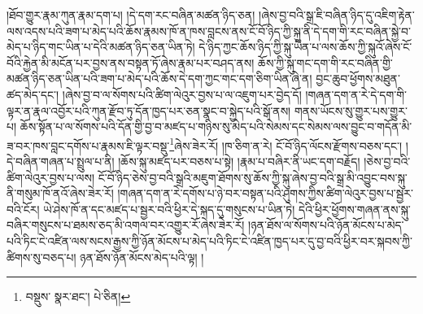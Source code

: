 །ཐོབ་གྱུར་རྣམ་ཀུན་རྣམ་དག་པ། །དེ་དག་རང་བཞིན་མཚན་ཉིད་ཅན། །ཞེས་བྱ་བའི་སྒྲ་ཇི་བཞིན་ཉིད་དུ་འཇིག་རྟེན་ལས་འདས་པའི་ཟག་པ་མེད་པའི་ཆོས་རྣམས་ཁོ་ན་ཁས་བླངས་ནས་ངོ་བོ་ཉིད་ཀྱི་སྐུ་ནི་དེ་དག་གི་རང་བཞིན་སྐྱེ་བ་མེད་པ་ཉིད་གང་ཡིན་པ་དེའི་མཚན་ཉིད་ཅན་ཡིན་ཏེ། དེ་ཉིད་ཀྱང་ཆོས་ཉིད་ཀྱི་སྐུ་ཡིན་པ་ལས་ཆོས་ཀྱི་སྐུའོ་ཞེས་ངོ་བོའི་རྐྱེན་མི་མངོན་པར་བྱས་ནས་བསྟན་ཏོ་ཞེས་རྣམ་པར་བཤད་ནས། ཆོས་ཀྱི་སྐུ་གང་དག་གི་རང་བཞིན་གྱི་མཚན་ཉིད་ཅན་ཡིན་པའི་ཟག་པ་མེད་པའི་ཆོས་དེ་དག་ཀྱང་གང་དག་ཅིག་ཡིན་ཞེ་ན། བྱང་ཆུབ་ཕྱོགས་མཐུན་ཚད་མེད་དང་། །ཞེས་བྱ་བ་ལ་སོགས་པའི་ཚིག་ལེའུར་བྱས་པ་ལ་འཇུག་པར་བྱེད་དོ། །གཞན་དག་ན་རེ་དེ་དག་གི་ལྟར་ན་རྣལ་འབྱོར་པའི་ཀུན་རྫོབ་ཏུ་དོན་ཁྱད་པར་ཅན་སྣང་བ་སྐྱེད་པའི་སྒོ་ནས། གནས་ཡོངས་སུ་གྱུར་པས་གྱུར་པ། ཆོས་སྟོན་པ་ལ་སོགས་པའི་དོན་གྱི་བྱ་བ་མཛད་པ་གཉིས་སུ་མེད་པའི་སེམས་དང་སེམས་ལས་བྱུང་བ་གདོན་མི་ཟ་བར་ཁས་བླང་དགོས་པ་རྣམས་ཇི་ལྟར་བསྡུ་\footnote{བསྡུས་  སྣར་ཐང་།  པེ་ཅིན། }ཞེས་ཟེར་རོ། །ཁ་ཅིག་ན་རེ། ངོ་བོ་ཉིད་ལོངས་རྫོགས་བཅས་དང་། །དེ་བཞིན་གཞན་པ་སྤྲུལ་པ་ནི། །ཆོས་སྐུ་མཛད་པར་བཅས་པ་སྟེ། །རྣམ་པ་བཞིར་ནི་ཡང་དག་བརྗོད། །ཅེས་བྱ་བའི་ཚིག་ལེའུར་བྱས་པ་ལས། ངོ་བོ་ཉིད་ཅེས་བྱ་བའི་སྒྲའི་མཇུག་ཐོགས་སུ་ཆོས་ཀྱི་སྐུ་ཞེས་བྱ་བའི་སྒྲ་མི་འབྱུང་བས་སྐུ་ནི་གསུམ་ཁོ་ནའོ་ཞེས་ཟེར་རོ། །གཞན་དག་ན་རེ་དགོས་པ་ཉེ་བར་བསྟན་པའི་ཤུགས་ཀྱིས་ཚིག་ལེའུར་བྱས་པ་སྦྱར་བའི་ངོར། ཡེ་ཤེས་ཁོ་ན་དང་མཛད་པ་སྦྱར་བའི་ཕྱིར་དེ་སྐད་དུ་གསུངས་པ་ཡིན་ཏེ། དེའི་ཕྱིར་ཕྱོགས་གཞན་ནས་སྐུ་བཞིར་གསུངས་པ་ཐམས་ཅད་མི་འགལ་བར་འགྱུར་རོ་ཞེས་ཟེར་རོ། །ཉན་ཐོས་ལ་སོགས་པའི་ཉོན་མོངས་པ་མེད་པའི་ཏིང་ངེ་འཛིན་ལས་སངས་རྒྱས་ཀྱི་ཉོན་མོངས་པ་མེད་པའི་ཏིང་ངེ་འཛིན་ཁྱད་པར་དུ་བྱ་བའི་ཕྱིར་བར་སྐབས་ཀྱི་ཚིགས་སུ་བཅད་པ། ཉན་ཐོས་ཉོན་མོངས་མེད་པའི་ལྟ། །
